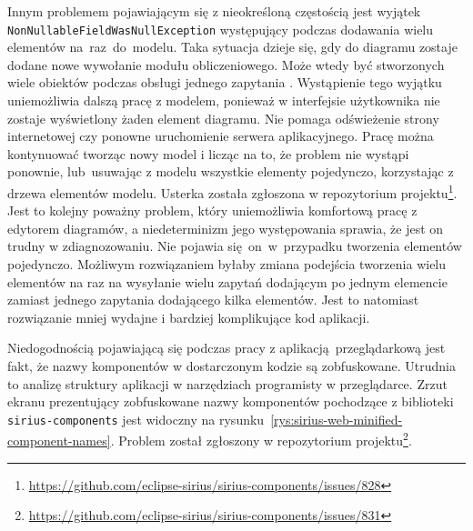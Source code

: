 Innym problemem pojawiającym się z nieokreśloną częstością jest wyjątek
\texttt{NonNullable\-FieldWasNullException} występujący podczas
dodawania wielu
elementów na~raz~do~modelu. Taka sytuacja dzieje się, gdy do diagramu zostaje
dodane nowe wywołanie modułu obliczeniowego. Może wtedy być stworzonych wiele
obiektów podczas obsługi jednego zapytania \GraphQL{}. Wystąpienie tego
wyjątku uniemożliwia dalszą pracę z modelem, ponieważ w interfejsie użytkownika
nie zostaje wyświetlony żaden element diagramu. Nie pomaga odświeżenie strony
internetowej czy ponowne uruchomienie serwera aplikacyjnego. Pracę można
kontynuować tworząc nowy model i licząc na to, że problem nie wystąpi ponownie,
lub~usuwając z modelu wszystkie elementy pojedynczo, korzystając z drzewa
elementów modelu. Usterka została zgłoszona w repozytorium
projektu\footnote{
	\url{https://github.com/eclipse-sirius/sirius-components/issues/828}
}. Jest to kolejny poważny problem, który uniemożliwia komfortową pracę z
edytorem diagramów, a niedeterminizm jego występowania sprawia, że jest on
trudny w zdiagnozowaniu. Nie pojawia się~on~w~przypadku tworzenia elementów
pojedynczo. Możliwym rozwiązaniem byłaby zmiana podejścia tworzenia wielu
elementów na raz na wysyłanie wielu zapytań \GraphQL{} dodającym po jednym
elemencie zamiast jednego zapytania dodającego kilka elementów. Jest to
natomiast rozwiązanie mniej wydajne i bardziej komplikujące kod aplikacji.

Niedogodnością pojawiającą się podczas pracy z aplikacją przeglądarkową
\SiriusWeb{} jest fakt, że nazwy komponentów w dostarczonym kodzie
\JavaScript{} są zobfuskowane. Utrudnia to analizę struktury aplikacji w
narzędziach programisty w przeglądarce. Zrzut ekranu prezentujący zobfuskowane
nazwy komponentów pochodzące z biblioteki \texttt{sirius-components} jest
widoczny na rysunku~\ref{rys:sirius-web-minified-component-names}. Problem
został zgłoszony w repozytorium
projektu\footnote{
	\url{https://github.com/eclipse-sirius/sirius-components/issues/831}
}.

